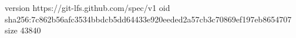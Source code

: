version https://git-lfs.github.com/spec/v1
oid sha256:7c862b56afc3534bbdcb5dd64433e920eeded2a57cb3c70869ef197eb8654707
size 43840

